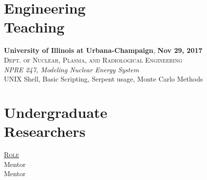 \documentclass[margin,line]{resume}
\begin{document}
\begin{resume}
    \section{\mysidestyle Engineering\\Teaching}
    \textbf{University of Illinois at Urbana-Champaign}, \hfill \textbf{Nov 29, 2017}\\
    \textsc{Dept. of Nuclear, Plasma, and Radiological Engineering}\\ 
               \textsl{NPRE 247, Modeling Nuclear Energy System}\\
               UNIX Shell, Basic Scripting, Serpent usage, Monte Carlo Methods
               \vspace{2mm}
    \section{\mysidestyle Undergraduate\\Researchers}
    \hfill\textsc{\underline{Role}}\\
    \hfill Mentor\\
    \hfill Mentor\\

\end{resume}
\end{document}
